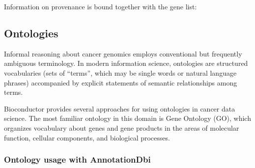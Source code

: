 Information on provenance is bound together with the gene list:

\begin{Shaded}
\begin{Highlighting}[]
\end{Highlighting}
\end{Shaded}

\hypertarget{ontologies}{%
\subsection{Ontologies}\label{ontologies}}

Informal reasoning about cancer genomics employs conventional
but frequently ambiguous terminology. In modern
information science, ontologies are structured vocabularies
(sets of ``terms'', which may be single words or natural language
phrases) accompanied by
explicit statements of semantic relationships among terms.

Bioconductor provides several approaches for using ontologies
in cancer data science. The most familiar ontology
in this domain is Gene Ontology (GO), which organizes vocabulary
about genes and gene products in
the areas of molecular function, cellular components, and
biological processes.

\hypertarget{ontology-usage-with-annotationdbi}{%
\subsubsection{Ontology usage with AnnotationDbi}\label{ontology-usage-with-annotationdbi}}

